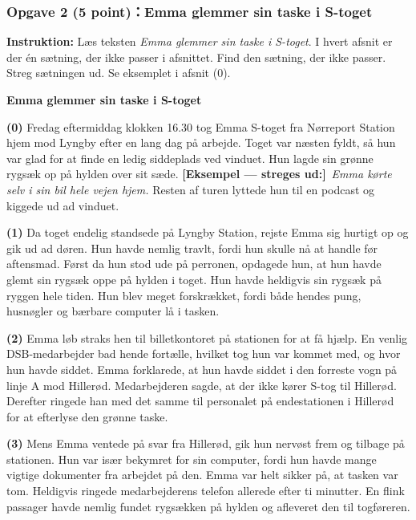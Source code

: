 \subsubsection*{Opgave 2 (5 point)：Emma glemmer sin taske i S-toget}

\textbf{Instruktion:} Læs teksten \textit{Emma glemmer sin taske i S-toget}. I hvert afsnit er der én sætning, der ikke passer i afsnittet. Find den sætning, der ikke passer. Streg sætningen ud. Se eksemplet i afsnit (0).

\vspace{0.3em}
\textbf{\color{NCDNavy}Emma glemmer sin taske i S-toget}

\textbf{(0)} Fredag eftermiddag klokken 16.30 tog Emma S-toget fra Nørreport Station hjem mod Lyngby efter en lang dag på arbejde. Toget var næsten fyldt, så hun var glad for at finde en ledig siddeplads ved vinduet. Hun lagde sin grønne rygsæk op på hylden over sit sæde. \textcolor{NCDRed}{\textbf{[Eksempel — streges ud:]}}\ \textit{Emma kørte selv i sin bil hele vejen hjem.} Resten af turen lyttede hun til en podcast og kiggede ud ad vinduet.

\textbf{(1)} Da toget endelig standsede på Lyngby Station, rejste Emma sig hurtigt op og gik ud ad døren. Hun havde nemlig travlt, fordi hun skulle nå at handle før aftensmad. Først da hun stod ude på perronen, opdagede hun, at hun havde glemt sin rygsæk oppe på hylden i toget. Hun havde heldigvis sin rygsæk på ryggen hele tiden. Hun blev meget forskrækket, fordi både hendes pung, husnøgler og bærbare computer lå i tasken.

\textbf{(2)} Emma løb straks hen til billetkontoret på stationen for at få hjælp. En venlig DSB-medarbejder bad hende fortælle, hvilket tog hun var kommet med, og hvor hun havde siddet. Emma forklarede, at hun havde siddet i den forreste vogn på linje A mod Hillerød. Medarbejderen sagde, at der ikke kører S-tog til Hillerød. Derefter ringede han med det samme til personalet på endestationen i Hillerød for at efterlyse den grønne taske.

\textbf{(3)} Mens Emma ventede på svar fra Hillerød, gik hun nervøst frem og tilbage på stationen. Hun var især bekymret for sin computer, fordi hun havde mange vigtige dokumenter fra arbejdet på den. Emma var helt sikker på, at tasken var tom. Heldigvis ringede medarbejderens telefon allerede efter ti minutter. En flink passager havde nemlig fundet rygsækken på hylden og afleveret den til togføreren.

